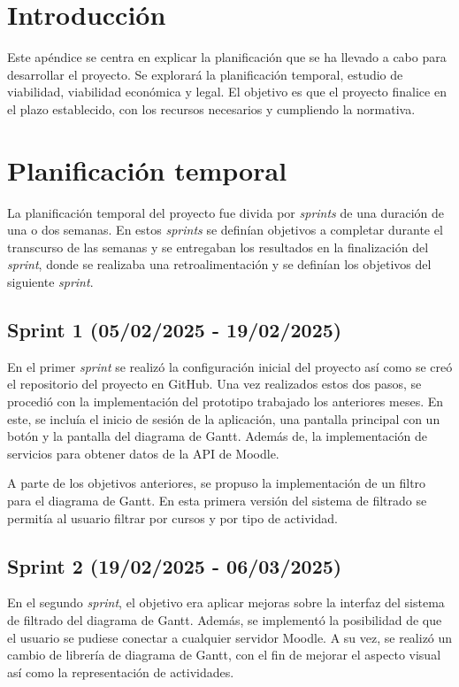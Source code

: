 
\section{Introducción}
Este apéndice se centra en explicar la planificación que se ha llevado a cabo para desarrollar el proyecto. Se explorará la planificación temporal, estudio de viabilidad, viabilidad económica y legal. El objetivo es que el proyecto finalice en el plazo establecido, con los recursos necesarios y cumpliendo la normativa.

\section{Planificación temporal}
La planificación temporal del proyecto fue divida por \textit{sprints} de una duración de una o dos semanas. En estos \textit{sprints} se definían objetivos a completar durante el transcurso de las semanas y se entregaban los resultados en la finalización del \textit{sprint}, donde se realizaba una retroalimentación y se definían los objetivos del siguiente \textit{sprint}.

\subsection{Sprint 1 (05/02/2025 - 19/02/2025)}
En el primer \textit{sprint} se realizó la configuración inicial del proyecto así como se creó el repositorio del proyecto en GitHub. Una vez realizados estos dos pasos, se procedió con la implementación del prototipo trabajado los anteriores meses. En este, se incluía el inicio de sesión de la aplicación, una pantalla principal con un botón y la pantalla del diagrama de Gantt. Además de, la implementación de servicios para obtener datos de la API de Moodle.

A parte de los objetivos anteriores, se propuso la implementación de un filtro para el diagrama de Gantt. En esta primera versión del sistema de filtrado se permitía al usuario filtrar por cursos y por tipo de actividad.

\subsection{Sprint 2 (19/02/2025 - 06/03/2025)}
En el segundo \textit{sprint}, el objetivo era aplicar mejoras sobre la interfaz del sistema de filtrado del diagrama de Gantt. Además, se implementó la posibilidad de que el usuario se pudiese conectar a cualquier servidor Moodle. A su vez, se realizó un cambio de librería de diagrama de Gantt, con el fin de mejorar el aspecto visual así como la representación de actividades.

